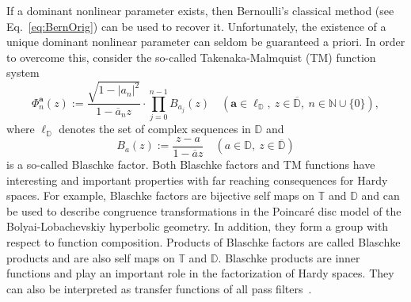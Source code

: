 \documentclass{arxiv}
\begin{document}
If a dominant nonlinear parameter exists, then Bernoulli's classical method (see Eq.~\eqref{eq:BernOrig}) can be used to recover it. Unfortunately, the existence of a unique dominant nonlinear parameter can seldom be guaranteed a priori. In order to overcome this, consider the so-called Takenaka-Malmquist (TM) function system~\cite{takenakaorig, malmquistorig}
\begin{equation}
    \label{eq:MT}
    \Phi_n^{\boldsymbol{a}}(z) := \frac{\sqrt{1 - |a_n|^2}}{1 - \overline{a}_n z} \cdot \prod_{j=0}^{n-1} B_{a_j}(z) \quad (\boldsymbol{a} \in \ell_{\mathbb{D}}, \ z \in \overline{\mathbb{D}}, \ n \in \mathbb{N} \cup \{0\}),
\end{equation}
where $\ell_{\mathbb{D}}$ denotes the set of complex sequences in $\mathbb{D}$ and
\begin{equation}
    \label{eq:Blaschfac}
    B_a(z) := \frac{z - a}{1 - \overline{a}z} \quad (a \in \mathbb{D}, \ z \in \overline{\mathbb{D}})
\end{equation}
is a so-called Blaschke factor. Both Blaschke factors and TM functions have interesting and important properties with far reaching consequences for Hardy spaces. For example, Blaschke factors are bijective self maps on $\mathbb{T}$ and $\mathbb{D}$ and can be used to describe congruence transformations in the Poincar\'e disc model of the Bolyai-Lobachevskiy hyperbolic geometry. In addition, they form a group with respect to function composition. Products of Blaschke factors are called Blaschke products and are also self maps on $\mathbb{T}$ and $\mathbb{D}$. Blaschke products are inner functions and play an important role in the factorization of Hardy spaces. They can also be interpreted as transfer functions of all pass filters~\cite{vandenhof, AllPassFilters}. 
\end{document}
